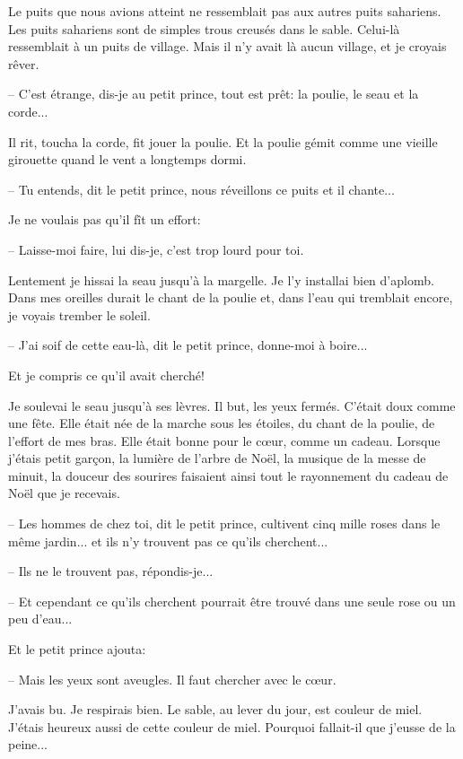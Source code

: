 \documentclass[a4paper]{report}
\begin{document}
Le puits que nous avions atteint ne ressemblait pas aux autres puits sahariens. Les puits sahariens sont de simples trous creusés dans le sable. Celui-là ressemblait à un puits de village. Mais il n'y avait là aucun village, et je croyais rêver.


-- C'est étrange, dis-je au petit prince, tout est prêt: la poulie, le seau et la corde...

Il rit, toucha la corde, fit jouer la poulie. Et la poulie gémit comme une vieille girouette quand le vent a longtemps dormi.

-- Tu entends, dit le petit prince, nous réveillons ce puits et il chante...

Je ne voulais pas qu'il fît un effort:

-- Laisse-moi faire, lui dis-je, c'est trop lourd pour toi.

Lentement je hissai la seau jusqu'à la margelle. Je l'y installai bien d'aplomb. Dans mes oreilles durait le chant de la poulie et, dans l'eau qui tremblait encore, je voyais trember le soleil.

-- J'ai soif de cette eau-là, dit le petit prince, donne-moi à boire...

Et je compris ce qu'il avait cherché!

Je soulevai le seau jusqu'à ses lèvres. Il but, les yeux fermés. C'était doux comme une fête. Elle était née de la marche sous les étoiles, du chant de la poulie, de l'effort de mes bras. Elle était bonne pour le cœur, comme un cadeau. Lorsque j'étais petit garçon, la lumière de l'arbre de Noël, la musique de la messe de minuit, la douceur des sourires faisaient ainsi tout le rayonnement du cadeau de Noël que je recevais.

-- Les hommes de chez toi, dit le petit prince, cultivent cinq mille roses dans le même jardin... et ils n'y trouvent pas ce qu'ils cherchent...

-- Ils ne le trouvent pas, répondis-je...

-- Et cependant ce qu'ils cherchent pourrait être trouvé dans une seule rose ou un peu d'eau...

Et le petit prince ajouta:

-- Mais les yeux sont aveugles. Il faut chercher avec le cœur.

J'avais bu. Je respirais bien. Le sable, au lever du jour, est couleur de miel. J'étais heureux aussi de cette couleur de miel. Pourquoi fallait-il que j'eusse de la peine...
\end{document}
